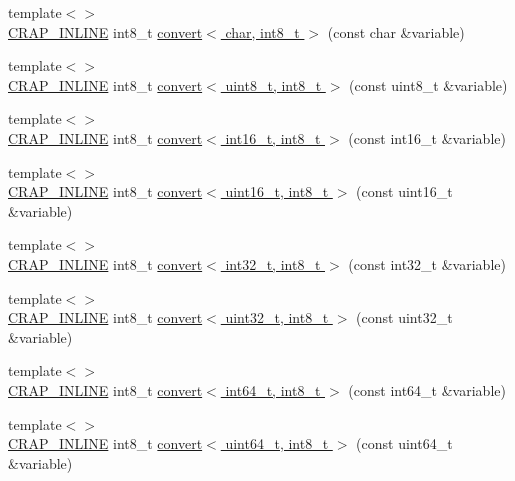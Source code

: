 \begin{DoxyCompactItemize}
\item 
{\footnotesize template$<$$>$ }\\\hyperlink{config__x86_8h_a5a40526b8d842e7ff731509998bb0f1c}{C\+R\+A\+P\+\_\+\+I\+N\+L\+I\+N\+E} int8\+\_\+t \hyperlink{namespacecrap_a7f3cc093da003ca8ae653016ec817f90}{convert$<$ char, int8\+\_\+t $>$} (const char \&variable)
\item 
{\footnotesize template$<$$>$ }\\\hyperlink{config__x86_8h_a5a40526b8d842e7ff731509998bb0f1c}{C\+R\+A\+P\+\_\+\+I\+N\+L\+I\+N\+E} int8\+\_\+t \hyperlink{namespacecrap_ab413a497df50e1b19ceaab87696acab2}{convert$<$ uint8\+\_\+t, int8\+\_\+t $>$} (const uint8\+\_\+t \&variable)
\item 
{\footnotesize template$<$$>$ }\\\hyperlink{config__x86_8h_a5a40526b8d842e7ff731509998bb0f1c}{C\+R\+A\+P\+\_\+\+I\+N\+L\+I\+N\+E} int8\+\_\+t \hyperlink{namespacecrap_ac2e5eaef53a4ca33288c2e6b37df0685}{convert$<$ int16\+\_\+t, int8\+\_\+t $>$} (const int16\+\_\+t \&variable)
\item 
{\footnotesize template$<$$>$ }\\\hyperlink{config__x86_8h_a5a40526b8d842e7ff731509998bb0f1c}{C\+R\+A\+P\+\_\+\+I\+N\+L\+I\+N\+E} int8\+\_\+t \hyperlink{namespacecrap_a676cd239b80b1c2aaf89b63f313800f8}{convert$<$ uint16\+\_\+t, int8\+\_\+t $>$} (const uint16\+\_\+t \&variable)
\item 
{\footnotesize template$<$$>$ }\\\hyperlink{config__x86_8h_a5a40526b8d842e7ff731509998bb0f1c}{C\+R\+A\+P\+\_\+\+I\+N\+L\+I\+N\+E} int8\+\_\+t \hyperlink{namespacecrap_a91acc42717c64a94df2b15986269f509}{convert$<$ int32\+\_\+t, int8\+\_\+t $>$} (const int32\+\_\+t \&variable)
\item 
{\footnotesize template$<$$>$ }\\\hyperlink{config__x86_8h_a5a40526b8d842e7ff731509998bb0f1c}{C\+R\+A\+P\+\_\+\+I\+N\+L\+I\+N\+E} int8\+\_\+t \hyperlink{namespacecrap_a712b151c55180b53fe2c610b8624bba0}{convert$<$ uint32\+\_\+t, int8\+\_\+t $>$} (const uint32\+\_\+t \&variable)
\item 
{\footnotesize template$<$$>$ }\\\hyperlink{config__x86_8h_a5a40526b8d842e7ff731509998bb0f1c}{C\+R\+A\+P\+\_\+\+I\+N\+L\+I\+N\+E} int8\+\_\+t \hyperlink{namespacecrap_a3ee286498cb4ee0dacd2aa4aaa8b9b7c}{convert$<$ int64\+\_\+t, int8\+\_\+t $>$} (const int64\+\_\+t \&variable)
\item 
{\footnotesize template$<$$>$ }\\\hyperlink{config__x86_8h_a5a40526b8d842e7ff731509998bb0f1c}{C\+R\+A\+P\+\_\+\+I\+N\+L\+I\+N\+E} int8\+\_\+t \hyperlink{namespacecrap_a41c26330623d6e71588e90b8c6a53816}{convert$<$ uint64\+\_\+t, int8\+\_\+t $>$} (const uint64\+\_\+t \&variable)

\end{DoxyCompactItemize}
